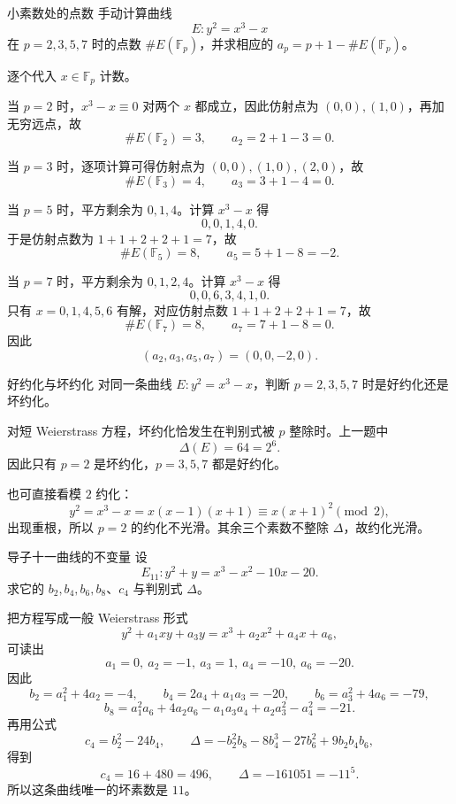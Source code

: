 \begin{problem}{小素数处的点数}
\easy
手动计算曲线
\[
E: y^2=x^3-x
\]
在 $p=2,3,5,7$ 时的点数 $\#E(\mathbb{F}_p)$，并求相应的 $a_p=p+1-\#E(\mathbb{F}_p)$。
\end{problem}
\begin{solution}
逐个代入 $x\in\mathbb{F}_p$ 计数。

当 $p=2$ 时，$x^3-x\equiv 0$ 对两个 $x$ 都成立，因此仿射点为 $(0,0),(1,0)$，再加无穷远点，故
\[
\#E(\mathbb{F}_2)=3,
\qquad
a_2=2+1-3=0.
\]

当 $p=3$ 时，逐项计算可得仿射点为 $(0,0),(1,0),(2,0)$，故
\[
\#E(\mathbb{F}_3)=4,
\qquad
a_3=3+1-4=0.
\]

当 $p=5$ 时，平方剩余为 $0,1,4$。计算 $x^3-x$ 得
\[
0,0,1,4,0.
\]
于是仿射点数为 $1+1+2+2+1=7$，故
\[
\#E(\mathbb{F}_5)=8,
\qquad
a_5=5+1-8=-2.
\]

当 $p=7$ 时，平方剩余为 $0,1,2,4$。计算 $x^3-x$ 得
\[
0,0,6,3,4,1,0.
\]
只有 $x=0,1,4,5,6$ 有解，对应仿射点数 $1+1+2+2+1=7$，故
\[
\#E(\mathbb{F}_7)=8,
\qquad
a_7=7+1-8=0.
\]
因此
\[
(a_2,a_3,a_5,a_7)=(0,0,-2,0).
\]
\end{solution}

\begin{problem}{好约化与坏约化}
\easy
对同一条曲线 $E:y^2=x^3-x$，判断 $p=2,3,5,7$ 时是好约化还是坏约化。
\end{problem}
\begin{solution}
对短 Weierstrass 方程，坏约化恰发生在判别式被 $p$ 整除时。上一题中
\[
\Delta(E)=64=2^6.
\]
因此只有 $p=2$ 是坏约化，$p=3,5,7$ 都是好约化。

也可直接看模 $2$ 约化：
\[
y^2=x^3-x=x(x-1)(x+1)\equiv x(x+1)^2 \pmod 2,
\]
出现重根，所以 $p=2$ 的约化不光滑。其余三个素数不整除 $\Delta$，故约化光滑。
\end{solution}

\begin{problem}{导子十一曲线的不变量}
\easy
设
\[
E_{11}: y^2+y=x^3-x^2-10x-20.
\]
求它的 $b_2,b_4,b_6,b_8$、$c_4$ 与判别式 $\Delta$。
\end{problem}
\begin{solution}
把方程写成一般 Weierstrass 形式
\[
y^2+a_1xy+a_3y=x^3+a_2x^2+a_4x+a_6,
\]
可读出
\[
a_1=0,\ a_2=-1,\ a_3=1,\ a_4=-10,\ a_6=-20.
\]
因此
\[
b_2=a_1^2+4a_2=-4,
\qquad
b_4=2a_4+a_1a_3=-20,
\qquad
b_6=a_3^2+4a_6=-79,
\]
\[
b_8=a_1^2a_6+4a_2a_6-a_1a_3a_4+a_2a_3^2-a_4^2=-21.
\]
再用公式
\[
c_4=b_2^2-24b_4,
\qquad
\Delta=-b_2^2b_8-8b_4^3-27b_6^2+9b_2b_4b_6,
\]
得到
\[
c_4=16+480=496,
\qquad
\Delta=-161051=-11^5.
\]
所以这条曲线唯一的坏素数是 $11$。
\end{solution}

